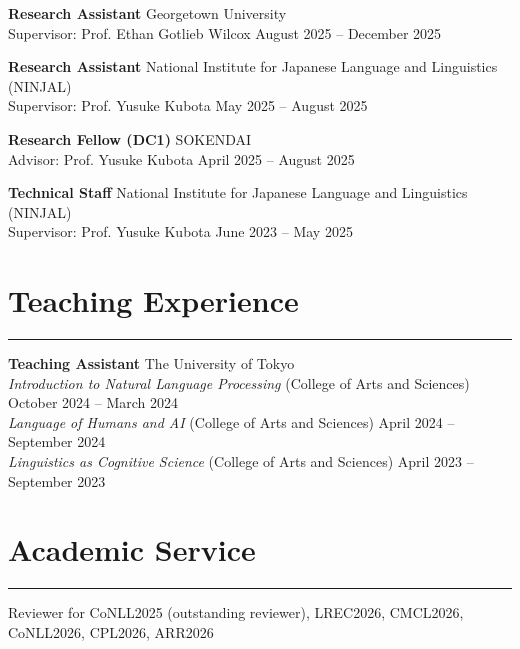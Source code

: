 \documentclass[10pt,a4paper]{article}
\newcommand{\entrygap}{\vspace{6pt}}
\newcommand{\rulegap}{\vspace{6pt}}
\begin{document}
\entrygap

\textbf{Research Assistant}
\hfill{Georgetown University} \\
Supervisor: Prof. Ethan Gotlieb Wilcox
\hfill{August 2025 -- December 2025}

\entrygap

\textbf{Research Assistant}
\hfill{National Institute for Japanese Language and Linguistics (NINJAL)} \\
Supervisor: Prof. Yusuke Kubota
\hfill{May 2025 -- August 2025}

\entrygap

\textbf{Research Fellow (DC1)}
\hfill{SOKENDAI} \\
Advisor: Prof. Yusuke Kubota
\hfill{April 2025 -- August 2025}

\entrygap

\textbf{Technical Staff}
\hfill{National Institute for Japanese Language and Linguistics (NINJAL)} \\
Supervisor: Prof. Yusuke Kubota
\hfill{June 2023 -- May 2025}



\section*{Teaching Experience}
\hrule
\rulegap

\textbf{Teaching Assistant}
\hfill{The University of Tokyo} \\
\textit{Introduction to Natural Language Processing} (College of Arts and Sciences)
\hfill{October 2024 -- March 2024} \\
\textit{Language of Humans and AI} (College of Arts and Sciences)
\hfill{April 2024 -- September 2024} \\
\textit{Linguistics as Cognitive Science} (College of Arts and Sciences)
\hfill{April 2023 -- September 2023}


\section*{Academic Service}
\hrule
\rulegap

Reviewer for CoNLL2025 (outstanding reviewer), LREC2026, CMCL2026, CoNLL2026, CPL2026, ARR2026



\end{document}
